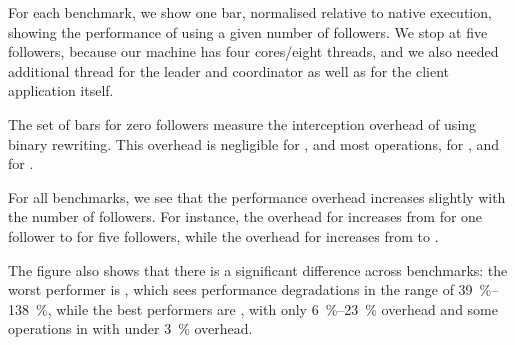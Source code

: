 For each benchmark, we show one bar, normalised relative to native execution,
showing the performance of \varan using a given number of followers.  We stop
at five followers, because our machine has four cores/eight threads, and we
also needed additional thread for the leader and coordinator as well as for the
client application itself.

The set of bars for zero followers measure the interception overhead
of \varan using binary rewriting.  This overhead is negligible for
\lighttpdtwo, \memcached and most \redis operations, \nginxIntercept for
\nginx, and \beanstalkdIntercept for \beanstalkd.

For all benchmarks, we see that the performance overhead increases slightly
with the number of followers. For instance, the overhead for \beanstalkd
increases from \beanstalkdOneFollower for one follower to
\beanstalkdFiveFollowers for five followers, while the overhead for \memcached
increases from \memcachedOneFollower to \memcachedFiveFollowers.

The figure also shows that there is a significant difference across benchmarks:
the worst performer is \redis, which sees performance degradations in the range
of \SIrange{39}{138}{\percent}, while the best performers are \lighttpdtwo,
with only \SIrange{6}{23}{\percent} overhead and some operations in \redis with
under \SI{3}{\percent} overhead.
